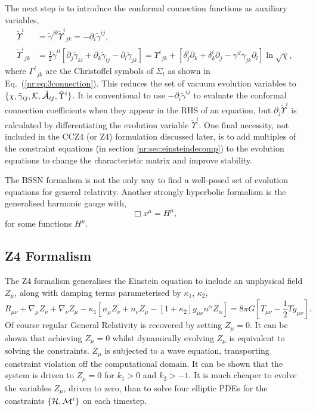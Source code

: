 The next step is to introduce the conformal connection functions as auxiliary variables, 
\begin{align} 
\tilde{\Upsilon}^i &= \tilde{\gamma}^{jk}\tilde{\Upsilon}^i_{\,\;jk} = -\partial_i \tilde{\gamma}^{ij},\\
 \tilde{\Upsilon}^i_{\,\;jk} &= \frac{1}{2}\tilde{\gamma}^{il}\left[ \partial_j \tilde{\gamma}_{kl} + \partial_k \tilde{\gamma}_{lj} - \partial_l \tilde{\gamma}_{jk}\right] = \Upsilon^i_{\;\,jk} + \left[ \delta^i_j \partial_k + \delta^i_k \partial_j - \gamma^{il}\gamma_{jk}\partial_l\right] \ln \sqrt{\chi},
 \end{align}
where $\Gamma^i_{\,\,\,jk}$ are the Christoffel symbols of $\Sigma_t$ as shown in Eq.~(\ref{nr:eq:3connection}).
This reduces the set of vacuum evolution variables to $\{\chi,\tilde{\gamma}_{ij},\mathcal{K},\tilde{\mathcal{A}}_{ij},\tilde{\Upsilon}^i \}$. It is conventional to use $-\partial_i \tilde{\gamma}^{ij}$ to evaluate the conformal connection coefficients when they appear in the RHS of an equation, but $\partial_j \tilde{\Upsilon}^i$ is calculated by differentiating the evolution variable $\tilde{\Upsilon}^i$. One final necessity, not included in the CCZ4 \color{orchid} (or Z4) \color{black} formulation discussed later, is to add multiples of the constraint equations (in section \ref{nr:sec:einsteindecomp}) to the evolution equations to change the characteristic matrix and improve stability. 

The BSSN formalism is not the only way to find a well-posed set of evolution equations for general relativity. Another strongly hyperbolic formalism is the generalised harmonic gauge \cite{Garfinkle:2001ni} \cite{garfinkle2002harmonic} \cite{Pretorius:2004jg} \cite{Pretorius:2005gq} with, 
\begin{equation}\Box x^\mu = H^\mu,\end{equation}
for some functions $H^\mu$.


\subsection{Z4 Formalism}
The Z4 formalism \cite{gundlach2005constraint} generalises the Einstein equation to include an unphysical field $Z_\mu$, along with damping terms parameterised by $\kappa_1$, $\kappa_2$, 
\begin{equation}\label{nr:eq:z4einstein} R_{\mu\nu} + \nabla_\mu Z_\nu + \nabla_\nu Z_\mu - \kappa_1\left[ n_\mu Z_\nu + n_\nu Z_\mu - [1+\kappa_2]g_{\mu\nu}n^\alpha Z_\alpha\right] = 8\pi G \left[T_{\mu\nu}- \frac{1}{2}Tg_{\mu\nu} \right].\end{equation}
Of course regular General Relativity is recovered by setting $Z_\mu=0$. It can be shown that achieving $Z_\mu=0$ whilst dynamically evolving $Z_\mu$  is equivalent to solving the constraints. $Z_\mu$ is subjected to a wave equation, transporting constraint violation off the computational domain. It can be shown that the system is driven to $Z_\mu =0$ for $k_1>0$ and $k_2>-1$. It is much cheaper to evolve the variables $Z_\mu$, driven to zero, than to solve four elliptic PDEs for the constraints $\{\mathcal{H},\mathcal{M}^i\}$ on each timestep. 


